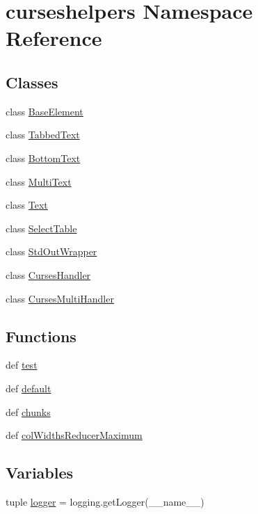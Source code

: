 \section{curseshelpers Namespace Reference}
\label{namespacecurseshelpers}
\subsection*{Classes}
\begin{DoxyCompactItemize}
\item 
class \hyperlink{classcurseshelpers_1_1BaseElement}{Base\-Element}
\item 
class \hyperlink{classcurseshelpers_1_1TabbedText}{Tabbed\-Text}
\item 
class \hyperlink{classcurseshelpers_1_1BottomText}{Bottom\-Text}
\item 
class \hyperlink{classcurseshelpers_1_1MultiText}{Multi\-Text}
\item 
class \hyperlink{classcurseshelpers_1_1Text}{Text}
\item 
class \hyperlink{classcurseshelpers_1_1SelectTable}{Select\-Table}
\item 
class \hyperlink{classcurseshelpers_1_1StdOutWrapper}{Std\-Out\-Wrapper}
\item 
class \hyperlink{classcurseshelpers_1_1CursesHandler}{Curses\-Handler}
\item 
class \hyperlink{classcurseshelpers_1_1CursesMultiHandler}{Curses\-Multi\-Handler}
\end{DoxyCompactItemize}
\subsection*{Functions}
\begin{DoxyCompactItemize}
\item 
def \hyperlink{namespacecurseshelpers_a733634be840be3023b0841ba9c447101}{test}
\item 
def \hyperlink{namespacecurseshelpers_a51ef335e2c1e619dbc69a80c2a78bef7}{default}
\item 
def \hyperlink{namespacecurseshelpers_ad5e4852e2c0a0159d740761730dbcb85}{chunks}
\item 
def \hyperlink{namespacecurseshelpers_ad3ed6836b3f87f95b7bb1ee2fb25e99f}{col\-Widths\-Reducer\-Maximum}
\end{DoxyCompactItemize}
\subsection*{Variables}
\begin{DoxyCompactItemize}
\item 
tuple \hyperlink{namespacecurseshelpers_afb5883585b25af527c1f446a6ee188a1}{logger} = logging.\-get\-Logger(\-\_\-\-\_\-name\-\_\-\-\_\-)
\end{DoxyCompactItemize}


